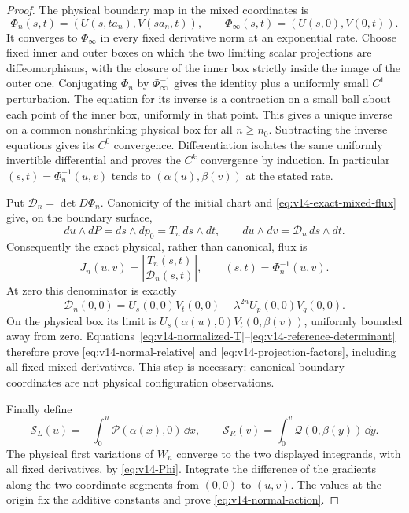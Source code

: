 \begin{proof}
The physical boundary map in the mixed coordinates is
\begin{equation}\label{eq:v14-Phi}
 \Phi_n(s,t)=(U(s,t a_n),V(s a_n,t)),\qquad
 \Phi_\infty(s,t)=(U(s,0),V(0,t)).
\end{equation}
It converges to $\Phi_\infty$ in every fixed derivative norm at an
exponential rate. Choose fixed inner and outer boxes on which the two
limiting scalar projections are diffeomorphisms, with the closure of
the inner box strictly inside the image of the outer one. Conjugating
$\Phi_n$ by $\Phi_\infty^{-1}$ gives the identity plus a uniformly
small $C^1$ perturbation. The equation for its inverse is a contraction
on a small ball about each point of the inner box, uniformly in that
point. This gives a unique inverse on a common nonshrinking physical
box for all $n\ge n_0$. Subtracting the inverse equations gives its
$C^0$ convergence. Differentiation isolates the same uniformly
invertible differential and proves the $C^k$ convergence by induction.
In particular $(s,t)=\Phi_n^{-1}(u,v)$ tends to
$(\alpha(u),\beta(v))$ at the stated rate.

Put $\mathcal D_n=\det D\Phi_n$. Canonicity of the initial chart
and \eqref{eq:v14-exact-mixed-flux} give, on the boundary surface,
\[
 du\wedge dP=ds\wedge dp_0=T_n\,ds\wedge dt,
 \qquad du\wedge dv=\mathcal D_n\,ds\wedge dt.
\]
Consequently the exact physical, rather than canonical, flux is
\begin{equation}\label{eq:v14-physical-flux}
 J_n(u,v)=\left|\frac{T_n(s,t)}{\mathcal D_n(s,t)}\right|,
                         \qquad (s,t)=\Phi_n^{-1}(u,v).
\end{equation}
At zero this denominator is exactly
\begin{equation}\label{eq:v14-reference-determinant}
 \mathcal D_n(0,0)=U_s(0,0)V_t(0,0)
              -\lambda^{2n}U_p(0,0)V_q(0,0).
\end{equation}
On the physical box its limit is
$U_s(\alpha(u),0)V_t(0,\beta(v))$, uniformly bounded away from
zero. Equations~\eqref{eq:v14-normalized-T}--\eqref{eq:v14-reference-determinant}
therefore prove \eqref{eq:v14-normal-relative} and
\eqref{eq:v14-projection-factors}, including all fixed mixed derivatives.
This step is necessary: canonical boundary coordinates are not physical
configuration observations.

Finally define
\[
 \mathcal S_L(u)=-\int_0^u\mathcal P(\alpha(x),0)\,\dd x,
 \qquad
 \mathcal S_R(v)=\int_0^v\mathcal Q(0,\beta(y))\,\dd y.
\]
The physical first variations of $W_n$ converge to the two displayed
integrands, with all fixed derivatives, by \eqref{eq:v14-Phi}.
Integrate the difference of the gradients along the two coordinate
segments from $(0,0)$ to $(u,v)$. The values at the origin fix the
additive constants and prove \eqref{eq:v14-normal-action}.
\end{proof}

